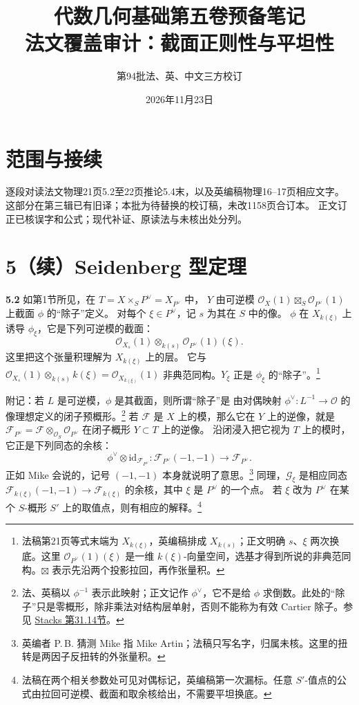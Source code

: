 \documentclass[openany,fontset=fandol]{ctexbook}
\newcommand{\OO}{\mathcal O}
\newcommand{\FF}{\mathcal F}
\newcommand{\GG}{\mathcal G}
\newcommand{\id}{\mathrm{id}}
\newcommand{\tagitem}[2]{\par\medskip\noindent\textbf{#1\quad #2}\enspace}
\begin{document}
\title{代数几何基础第五卷预备笔记\\法文覆盖审计：截面正则性与平坦性}
\author{第94批\quad 法、英、中文三方校订}
\date{2026年11月23日}
\maketitle

\section*{范围与接续}
逐段对读法文物理21页5.2至22页推论5.4末，以及英编稿物理16--17页相应文字。
这部分在第三辑已有旧译；本批为待替换的校订稿，未改1158页合订本。
正文订正已核误字和公式；现代补证、原读法与未核出处分列。

\section*{5（续）\quad Seidenberg 型定理}
\tagitem{5.2}{}
如第1节所见，在 $T=X\times_S P^\vee=X_{P^\vee}$ 中，
$Y$ 由可逆模 $\OO_X(1)\boxtimes_S\OO_{P^\vee}(1)$ 上截面 $\phi$ 的“除子”定义。
对每个 $\xi\in P^\vee$，记 $s$ 为其在 $S$ 中的像。
$\phi$ 在 $X_{k(\xi)}$ 上诱导 $\phi_\xi$，它是下列可逆模的截面：
\[
 \OO_{X_s}(1)\otimes_{k(s)}\OO_{P^\vee}(1)(\xi).
\]
这里把这个张量积理解为 $X_{k(\xi)}$ 上的层。
它与 $\OO_{X_s}(1)\otimes_{k(s)}k(\xi)=\OO_{X_{k(\xi)}}(1)$
非典范同构。$Y_\xi$ 正是 $\phi_\xi$ 的“除子”。\footnote{法稿第21页等式末端为 $X_{k(\xi)}$，英编稿排成 $X_{k(s)}$；正文明确 $s$、$\xi$ 两次换底。这里 $\OO_{P^\vee}(1)(\xi)$ 是一维 $k(\xi)$-向量空间，选基才得到所说的非典范同构。$\boxtimes$ 表示先沿两个投影拉回，再作张量积。}

附记：若 $L$ 是可逆模，$\phi$ 是其截面，则所谓“除子”是
由对偶映射 $\phi^\vee:L^{-1}\to\OO$ 的像理想定义的闭子预概形。\footnote{法、英稿以 $\phi^{-1}$ 表示此映射；正文记作 $\phi^\vee$，它不是给 $\phi$ 求倒数。此处的“除子”只是零概形，除非乘法对结构层单射，否则不能称为有效 Cartier 除子。参见 \href{https://stacks.math.columbia.edu/tag/01WQ}{Stacks 第31.14节}。}
若 $\FF$ 是 $X$ 上的模，那么它在 $Y$ 上的逆像，就是
$\FF_{P^\vee}=\FF\otimes_{\OO_S}\OO_{P^\vee}$ 在闭子概形 $Y\subset T$ 上的逆像。
沿闭浸入把它视为 $T$ 上的模时，它正是下列同态的余核：
\[
 \phi^\vee\otimes\id_{\FF_{P^\vee}}:
 \FF_{P^\vee}(-1,-1)\longrightarrow\FF_{P^\vee}.
\]
正如 Mike 会说的，记号 $(-1,-1)$ 本身就说明了意思。\footnote{英编者 P.\,B. 猜测 Mike 指 Mike Artin；法稿只写名字，归属未核。这里的扭转是两因子反扭转的外张量积。}
同理，$\GG_\xi$ 是相应同态
$\FF_{k(\xi)}(-1,-1)\to\FF_{k(\xi)}$ 的余核，其中 $\xi$ 是 $P^\vee$ 的一个点。
若 $\xi$ 改为 $P^\vee$ 在某个 $S$-概形 $S'$ 上的取值点，则有相应的解释。\footnote{法稿在两个相关参数处可见对偶标记，英编稿第一次漏标。任意 $S'$-值点的公式由拉回可逆模、截面和取余核给出，不需要平坦换底。}
\end{document}
